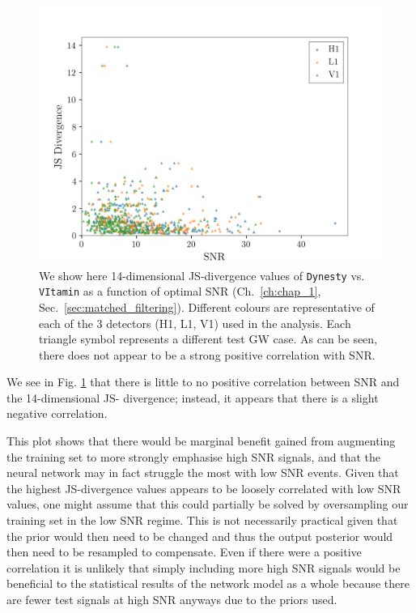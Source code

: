 \begin{figure}
    \includegraphics[width=\columnwidth]{figures/JS_vs_SNR.png}
    \caption[14-dimensional JS-divergences of \texttt{Dynesty} vs. \texttt{VItamin} as a function of individual detector optimal SNR.]{\label{fig:JS_vs_SNR_dynesty} We show here 14-dimensional 
    \ac{JS}-divergence values of \texttt{Dynesty} vs. \texttt{VItamin} as a function of optimal
    \ac{SNR} (Ch.~\ref{ch:chap_1}, Sec.~\ref{sec:matched_filtering}). Different colours are representative of each of the 3 detectors (H1, L1, V1) used in the analysis. Each triangle symbol represents a different test \ac{GW} case. As can 
    be seen, there does not appear to be a strong positive correlation with \ac{SNR}.}
\end{figure}

We see in Fig. \ref{fig:JS_vs_SNR_dynesty} that there is little to no 
positive correlation between \ac{SNR} and the 14-dimensional \ac{JS}-
divergence; instead, it appears that there is a slight negative 
correlation.

This plot shows that there would be marginal benefit gained from augmenting 
the training set to more strongly emphasise high \ac{SNR} 
signals, and that the neural network may in fact struggle the most 
with low \ac{SNR} events. Given that the highest \ac{JS}-divergence values 
appears to be loosely correlated with low \ac{SNR} values, one might assume 
that this could partially be solved by oversampling our training set 
in the low \ac{SNR} regime. This is not necessarily practical given that 
the prior would then need to be changed and thus the output posterior 
would then need to be resampled to compensate.  Even if there were a positive correlation it is unlikely that simply including more high \ac{SNR} signals would be beneficial to the statistical results of the network model as a whole because there are fewer test signals at high \ac{SNR} anyways due to the priors used.~

